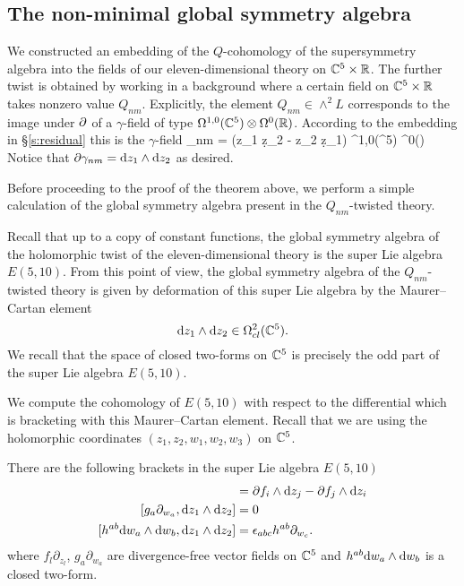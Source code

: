 
%

\subsection{The non-minimal global symmetry algebra}

We constructed an embedding of the $Q$-cohomology of the supersymmetry algebra into the fields of our eleven-dimensional theory on $\mathbb C^5 \times \mathbb R$. 
The further twist is obtained by working in a background where a certain field on $\mathbb C^5 \times \mathbb R$ takes nonzero value $Q_{nm}$. 
Explicitly, the element $Q_{nm} \in \wedge^2 L$ corresponds to the image under $\partial$ of a $\gamma$-field of type $\Omega^{1,0}(\mathbb C^5) \otimes \Omega^0(\mathbb R)$. 
According to the embedding in \S \ref{s:residual} this is the $\gamma$-field 
\beqn\label{eqn:gammanm}
\gamma_{nm} =  (z_1 \d z_2 - z_2 \d z_1) \in \Omega^{1,0}(\CC^5) \otimes \Omega^0(\RR) 
\eeqn
Notice that $\partial \gamma_{nm} = {\rm d} z_1 \wedge {\rm d} z_2$ as desired.

Before proceeding to the proof of the theorem above, we perform a simple calculation of the global symmetry algebra present in the $Q_{nm}$-twisted theory. 

Recall that up to a copy of constant functions, the global symmetry algebra of the holomorphic twist of the eleven-dimensional theory is the super Lie algebra $E(5,10)$.
From this point of view, the global symmetry algebra of the $Q_{nm}$-twisted theory is given by deformation of this super Lie algebra by the Maurer--Cartan element 
\[
{\rm d} z_1 \wedge {\rm d} z_2 \in \Omega^{2}_{cl}(\mathbb C^5) .
\]
We recall that the space of closed two-forms on $\mathbb C^5$ is precisely the odd part of the super Lie algebra $E(5,10)$. 

We compute the cohomology of $E(5,10)$ with respect to the differential which is bracketing with this Maurer--Cartan element. 
Recall that we are using the holomorphic coordinates $(z_1,z_2,w_1,w_2,w_3)$ on $\mathbb C^5$. 

There are the following brackets in the super Lie algebra $E(5,10)$ 
\begin{align*}
[f_l \partial_{z_l} , \d z_1 \wedge \d z_2] & = \del f_i \wedge \d z_j - \del f_j \wedge \d z_i \\
[g_a \partial_{w_a} , \d z_1 \wedge \d z_2] & = 0 \\
[h^{ab} \d w_a \wedge \d w_b , \d z_1 \wedge \d z_2 ] & = \ep_{abc} h^{ab} \partial_{w_c} .
\end{align*}
where $f_l \partial_{z_l}$, $g_a \partial_{w_a}$ are divergence-free vector fields on $\mathbb C^5$ and $h^{ab} {\rm d} w_a \wedge {\rm d} w_b$ is a closed two-form. 


